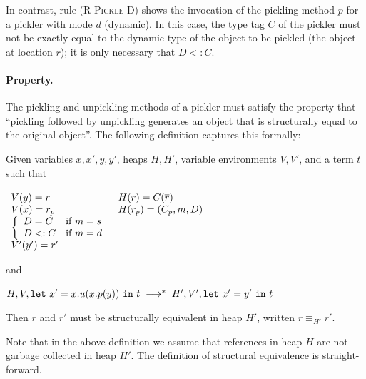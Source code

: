 \documentclass[10pt]{sigplanconf}
\theoremstyle{definition}
\theoremstyle{definition}
\newcommand{\ba}{\begin{array}}
\newcommand{\ea}{\end{array}}
\newcommand{\sub}{<:}
\newcommand{\seq}[1]{\overline{#1}}
\newcommand{\sreducestarbreak}[6]{#1, #2, #3 \\ \;\longrightarrow^{\ast}\; #4, #5, #6}
\begin{document}
In contrast, rule \textsc{(R-Pickle-D)} shows the invocation of the pickling
method $p$ for a pickler with mode $d$ (dynamic). In this case, the type tag
$C$ of the pickler must not be exactly equal to the dynamic type of the object
to-be-pickled (the object at location $r$); it is only necessary that $D \sub
C$.

\paragraph{Property.} The pickling and unpickling methods of a pickler must
satisfy the property that ``pickling followed by unpickling generates an
object that is structurally equal to the original object''. The following
definition captures this formally:

\begin{defn}

Given variables $x,x',y,y'$, heaps $H,H'$, variable environments $V,V'$, and a
term $t$ such that

$\ba[t]{ll@{\hspace{2mm}}}
V(y) = r     &  H(r)   = C(\seq{r})  \\
V(x) = r_p   &  H(r_p) = (C_p, m, D) \\
\left\{
  \ba{ll}
  D = C     & \text{if}~m=s \\
  D \sub C  & \text{if}~m=d
  \ea
  \right.   &               \\
V'(y') = r'  &               \\
\ea$

and

$
\sreducestarbreak H V {\texttt{let}~x' = x.u(x.p(y))~\texttt{in}~t}
  {H'} {V'} {\texttt{let}~x' = y'~\texttt{in}~t}
$

Then $r$ and $r'$ must be structurally equivalent in heap $H'$, written $r
\equiv_{H'} r'$.

\end{defn}

Note that in the above definition we assume that references in heap $H$ are
not garbage collected in heap $H'$. The definition of structural equivalence
is straight-forward.
\end{document}
